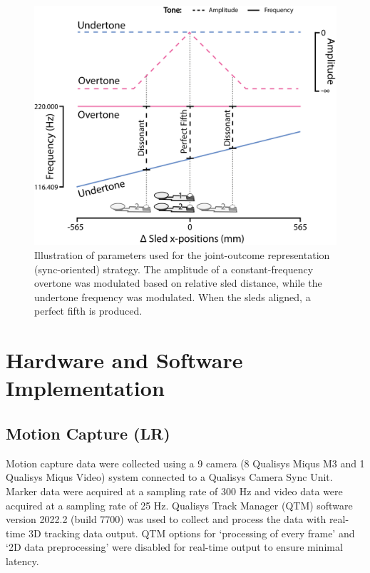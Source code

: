 \documentclass[10pt,a4paper,onecolumn]{article}
\begin{document}
\begin{figure}[h]

{\centering \includegraphics[width=1\linewidth]{figures/sync_sonif_illustration} 

}

\caption{Illustration of parameters used for the joint-outcome representation (sync-oriented) strategy. The amplitude of a constant-frequency overtone was modulated based on relative sled distance, while the undertone frequency was modulated. When the sleds aligned, a perfect fifth is produced.}\label{fig:sync-illustration}
\end{figure}

\hypertarget{hardware-and-software-implementation}{%
\section{Hardware and Software Implementation}\label{hardware-and-software-implementation}}

\hypertarget{motion-capture-lr}{%
\subsection{Motion Capture (LR)}\label{motion-capture-lr}}

Motion capture data were collected using a 9 camera (8 Qualisys Miqus M3 and 1 Qualisys Miqus Video) system connected to a Qualisys Camera Sync Unit. Marker data were acquired at a sampling rate of 300 Hz and video data were acquired at a sampling rate of 25 Hz. Qualisys Track Manager (QTM) software version 2022.2 (build 7700) was used to collect and process the data with real-time 3D tracking data output. QTM options for `processing of every frame' and `2D data preprocessing' were disabled for real-time output to ensure minimal latency.
\end{document}
